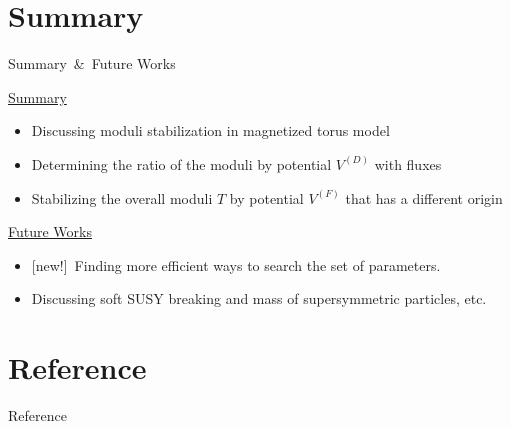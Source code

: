 \documentclass[
  unicode,a4paper,10pt,
  xcolor = {dvipsnames,svgnames},
  hyperref ={colorlinks=true,citecolor=Navy,linkcolor=NavyBlue,urlcolor=purple},
  ja=standard,lualatex
]{beamer}
\renewcommand{\theequation}{\thesection.\arabic{equation}}
\renewcommand{\thefigure}{\thesection.\arabic{figure}}
\renewcommand{\thetable}{\thesection.\arabic{table}}
\begin{document}
\section{Summary}


\begin{frame}{Summary\ \&\ Future Works}

  \uline{Summary}
  \begin{itemize}
    \item
          Discussing moduli stabilization in magnetized torus model
    \item
          Determining the ratio of the moduli by potential $V^{(D)}$ with fluxes
    \item
          Stabilizing the overall moduli $T$ by potential $V^{(F)}$ that has a different origin
  \end{itemize}

  \uline{Future Works}
  \begin{itemize}
    \item
          {[new!]}\ Finding more efficient ways to search the set of parameters.
    \item
          Discussing soft SUSY breaking and mass of supersymmetric particles, etc.
  \end{itemize}

\end{frame}



\setcounter{Appendix}{\value{framenumber}}
\setcounter{section}{0}
\renewcommand{\thesubsection}{\Alph{subsection}}
\makeatletter
\renewcommand{\theequation}{\thesubsection.\arabic{equation}}

\renewcommand{\thefigure}{\thesubsection.\arabic{figure}}

\renewcommand{\thetable}{\thesubsection.\arabic{table}}
\makeatother













\nocite{Wess:1992}

\section{Reference}
\begin{frame}{Reference}

  \scriptsize
  \beamertemplatetextbibitems
  
  

\end{frame}

\setcounter{framenumber}{\value{Appendix}}
\end{document}
